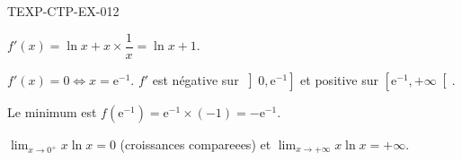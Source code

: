 \begin{corrige}{TEXP-CTP-EX-012}

$f'(x) = \ln x + x \times \dfrac{1}{x} = \ln x + 1$.


$f'(x) = 0 \iff x = \mathrm{e}^{-1}$. $f'$ est négative sur $\left]0, \mathrm{e}^{-1}\right]$ et positive sur $\left[\mathrm{e}^{-1}, +\infty\right[$.

Le minimum est $f(\mathrm{e}^{-1}) = \mathrm{e}^{-1} \times (-1) = -\mathrm{e}^{-1}$.

$\lim_{x \to 0^+} x\ln x = 0$ (croissances compareees) et $\lim_{x \to +\infty} x\ln x = +\infty$.

\end{corrige}
